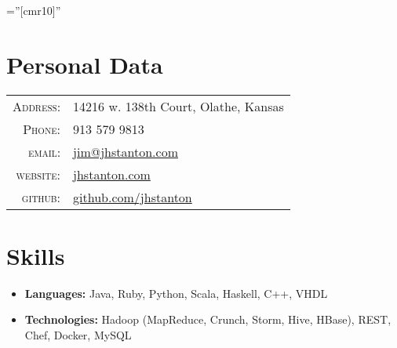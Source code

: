 \documentclass[10pt]{article} %
\begin{document}
\pagestyle{empty} %

\font\fb=''[cmr10]'' %


\par{\bigskip\par} %

\section{Personal Data}

\begin{table}[h]
\centering
\begin{tabular}{rl}
\textsc{Address:} & 14216 w. 138th Court, Olathe, Kansas \\
\textsc{Phone:} & 913 579 9813 \\
\textsc{email:} & \href{mailto:jim@jhstanton.com}{jim@jhstanton.com}\\
\textsc{website:} & \href{http://www.jhstanton.com}{jhstanton.com}\\
\textsc{github:} & \href{http://www.github.com/jhstanton}{github.com/jhstanton}
\end{tabular}
\end{table}


\section{Skills}

\begin{itemize}
\item \textbf{Languages:} Java, Ruby, Python, Scala, Haskell, C++, VHDL
\item \textbf{Technologies:} Hadoop (MapReduce, Crunch, Storm, Hive, HBase), REST, Chef, Docker, MySQL
\end{itemize}
\end{document}
